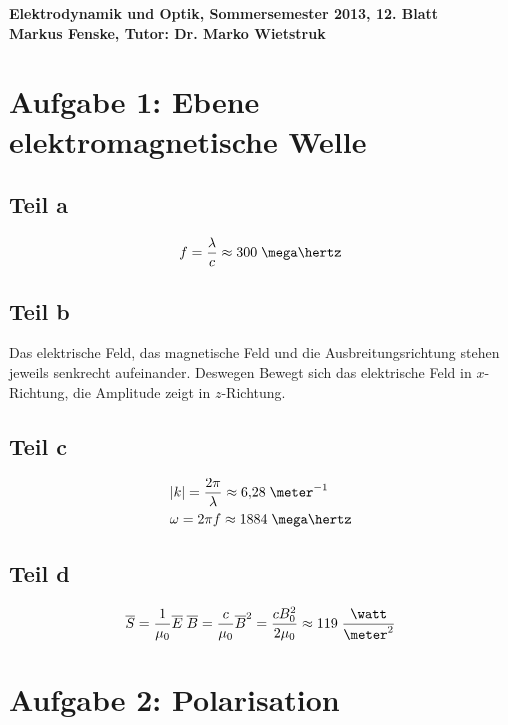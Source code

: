 \documentclass[a4paper,german,12pt,smallheadings]{scrartcl}
\begin{document}
\begin{center}
\bfseries %
\sffamily %
\vspace{-40pt}
Elektrodynamik und Optik, Sommersemester 2013, 12. Blatt \\
Markus Fenske, Tutor: Dr. Marko Wietstruk
\vspace{-10pt}
\end{center}
\section*{Aufgabe 1: Ebene elektromagnetische Welle}
\subsection*{Teil a}
\begin{align*}
  f = \frac{\lambda}{c} \approx 300 \;\mega\hertz
\end{align*}

\subsection*{Teil b}
Das elektrische Feld, das magnetische Feld und die Ausbreitungsrichtung stehen
jeweils senkrecht aufeinander. Deswegen Bewegt sich das elektrische Feld in
$x$-Richtung, die Amplitude zeigt in $z$-Richtung.

\subsection*{Teil c}
\begin{align*}
  &|k| = \frac{2 \pi}{\lambda} \approx 6{,}28 \;\meter^{-1} \\
  &\omega = 2\pi f \approx 1884 \;\mega\hertz
\end{align*}

\subsection*{Teil d}

\begin{align*}
  \overline{S} = \frac{1}{\mu_0} \overline{E}\; \overline{B} = \frac{c}{\mu_0} \overline{B}^2 = \frac{cB_{0}^2}{2\mu_0} \approx 119 \;\frac{\watt}{\meter^2}
\end{align*}

\section*{Aufgabe 2: Polarisation}
\end{document}
